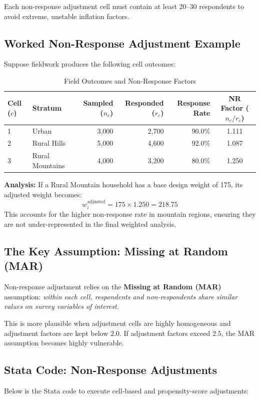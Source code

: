 \documentclass[11pt,a4paper]{article}
\begin{document}
\begin{diagnosticbox}
Each non-response adjustment cell must contain at least 20--30 respondents to avoid extreme, unstable inflation factors.
\end{diagnosticbox}

\newpage

\subsection{Worked Non-Response Adjustment Example}
Suppose fieldwork produces the following cell outcomes:

\begin{table}[htbp]
  \centering
  \caption{Field Outcomes and Non-Response Factors}
  \label{tab:nr_worked_example}
  \begin{tabular}{llrrrc}
    \toprule
    \textbf{Cell ($c$)} & \textbf{Stratum} & \textbf{Sampled ($n_c$)} & \textbf{Responded ($r_c$)} & \textbf{Response Rate} & \textbf{NR Factor ($n_c/r_c$)} \\
    \midrule
    1 & Urban & 3,000 & 2,700 & 90.0\% & 1.111 \\
    2 & Rural Hills & 5,000 & 4,600 & 92.0\% & 1.087 \\
    3 & Rural Mountains & 4,000 & 3,200 & 80.0\% & 1.250 \\
    \bottomrule
  \end{tabular}
\end{table}
\textbf{Analysis:} If a Rural Mountain household has a base design weight of 175, its adjusted weight becomes:
\[
  w_i^{\text{adjusted}} = 175 \times 1.250 = 218.75
\]
This accounts for the higher non-response rate in mountain regions, ensuring they are not under-represented in the final weighted analysis.

\subsection{The Key Assumption: Missing at Random (MAR)}
Non-response adjustment relies on the \textbf{Missing at Random (MAR)} assumption: \textit{within each cell, respondents and non-respondents share similar values on survey variables of interest.} 

This is more plausible when adjustment cells are highly homogeneous and adjustment factors are kept below $2.0$. If adjustment factors exceed $2.5$, the MAR assumption becomes highly vulnerable.

\subsection{Stata Code: Non-Response Adjustments}
Below is the Stata code to execute cell-based and propensity-score adjustments:
\end{document}
